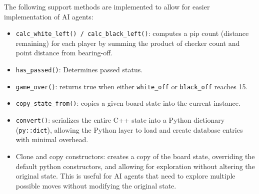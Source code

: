 The following support methods are implemented to allow for easier implementation of AI agents:
\begin{itemize}
    \item \texttt{calc\_white\_left() / calc\_black\_left()}: computes a pip count (distance remaining) for each player by summing the product of checker count and point distance from bearing-off.
    \item \texttt{has\_passed()}: Determines passed status.
    \item \texttt{game\_over()}: returns true when either \texttt{white\_off} or \texttt{black\_off} reaches 15.
    \item \texttt{copy\_state\_from()}: copies a given board state into the current instance.
    \item \texttt{convert()}: serializes the entire C++ state into a Python dictionary (\texttt{py::dict}), allowing the Python layer to load and create database entries with minimal overhead.
    \item Clone and copy constructors: creates a copy of the board state, overriding the default python constructors, and allowing for exploration without altering the original state. This is useful for AI agents that need to explore multiple possible moves without modifying the original state.
\end{itemize}

